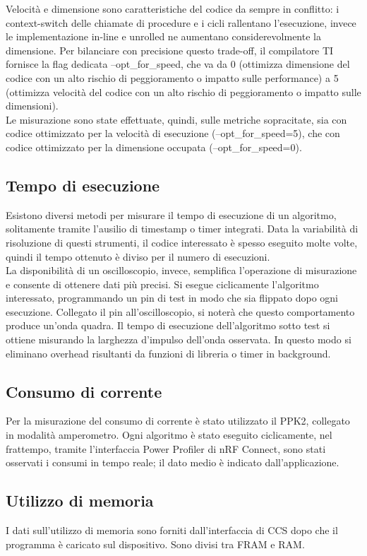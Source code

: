 \documentclass[target=bach,aauheader=,style=]{thud}
\begin{document}
	Velocità e dimensione sono caratteristiche del codice da sempre in conflitto: i context-switch delle chiamate di procedure e i cicli rallentano l'esecuzione, invece le implementazione in-line e unrolled ne aumentano considerevolmente la dimensione. Per bilanciare con precisione questo trade-off, il compilatore TI fornisce la flag dedicata --opt\_for\_speed, che va da 0 (ottimizza dimensione del codice con un alto rischio di peggioramento o impatto sulle performance) a 5 (ottimizza velocità del codice con un alto rischio di peggioramento o impatto sulle dimensioni).\\
	Le misurazione sono state effettuate, quindi, sulle metriche sopracitate, sia con codice ottimizzato per la velocità di esecuzione (--opt\_for\_speed=5), che con codice ottimizzato per la dimensione occupata (--opt\_for\_speed=0).
	
		\subsection{Tempo di esecuzione}
		Esistono diversi metodi per misurare il tempo di esecuzione di un algoritmo, solitamente tramite l'ausilio di timestamp o timer integrati. Data la variabilità di risoluzione di questi strumenti, il codice interessato è spesso eseguito molte volte, quindi il tempo ottenuto è diviso per il numero di esecuzioni.\\
		La disponibilità di un oscilloscopio, invece, semplifica l'operazione di misurazione e consente di ottenere dati più precisi. Si esegue ciclicamente l'algoritmo interessato, programmando un pin di test in modo che sia flippato dopo ogni esecuzione. Collegato il pin all'oscilloscopio, si noterà che questo comportamento produce un'onda quadra. Il tempo di esecuzione dell'algoritmo sotto test si ottiene misurando la larghezza d'impulso dell'onda osservata. In questo modo si eliminano overhead risultanti da funzioni di libreria o timer in background.
		\subsection{Consumo di corrente}
		Per la misurazione del consumo di corrente è stato utilizzato il PPK2, collegato in modalità amperometro. Ogni algoritmo è stato eseguito ciclicamente, nel frattempo, tramite l'interfaccia Power Profiler di nRF Connect, sono stati osservati i consumi in tempo reale; il dato medio è indicato dall'applicazione.
		\subsection{Utilizzo di memoria}
		I dati sull'utilizzo di memoria sono forniti dall'interfaccia di CCS dopo che il programma è caricato sul dispositivo. Sono divisi tra FRAM e RAM.
\end{document}
